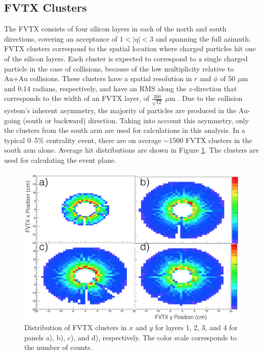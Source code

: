 
\subsection{FVTX Clusters}
The FVTX consists of four silicon layers in each of the north and south directions, covering an acceptance of $1 < | \eta | < 3$ and spanning the full azimuth. FVTX clusters correspond to the spatial location where charged particles hit one of the silicon layers. Each cluster is expected to correspond to a single charged particle in the case of \pau collisions, because of the low multiplicity relative to Au+Au collisions. These clusters have a spatial resolution in $r$ and $\phi$ of 50 $\mu$m and 0.14 radians, respectively, and have an RMS along the $z$-direction that corresponds to the width of an FVTX layer, of $\frac{200}{\sqrt{12}}$ $\mu$m \cite{Aidala201444}. Due to the \pau collision system's inherent asymmetry, the majority of particles are produced in the Au-going (south or backward) direction. Taking into account this asymmetry, only the clusters from the south arm are used for calculations in this analysis. In a typical 0--5$\%$ centrality event, there are on average $\sim$1500 FVTX clusters in the south arm alone. Average hit distributions are shown in Figure \ref{fig:fvtx_clusxy}. The clusters are used for calculating the event plane.

\begin{figure}[!ht]
\centering
\includegraphics[width=0.55\linewidth]{figs/fvtx_clus_xy.png}
\caption{Distribution of FVTX clusters in $x$ and $y$ for layers 1, 2, 3, and 4 for panels a), b), c), and d), respectively. The color scale corresponds to the number of counts.}
\label{fig:fvtx_clusxy}
\end{figure}

